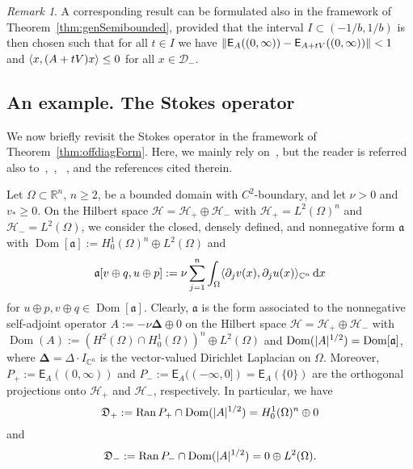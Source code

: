 \documentclass[11pt,a4paper]{amsart}
\numberwithin{equation}{section}
\DeclareMathOperator{\Ran}{Ran}
\DeclareMathOperator{\Dom}{Dom}
\DeclarePairedDelimiter{\abs}{|}{|}
\DeclarePairedDelimiter{\norm}{\lVert}{\rVert}
\DeclarePairedDelimiter{\scprod}{\langle}{\rangle}
\newcommand{\dd}{\mathrm d}
\newcommand{\RR}{\mathbb{R}}
\newcommand{\CC}{\mathbb{C}}
\newcommand{\EE}{\mathsf{E}}
\newcommand{\cD}{{\mathcal D}}
\newcommand{\cH}{{\mathcal H}}
\newcommand{\fa}{{\mathfrak a}}
\newcommand{\fD}{{\mathfrak D}}
\theoremstyle{plain}
\theoremstyle{definition}
\theoremstyle{remark}
\newtheorem{remark}[theorem]{Remark}
\begin{document}
\begin{remark}
  A corresponding result can be formulated also in the framework of Theorem~\ref{thm:genSemibounded}, provided that the interval
  $I \subset (-1/b,1/b)$ is then chosen such that for all $t \in I$ we have $\norm{\EE_A((0,\infty))-\EE_{A+tV}((0,\infty))} < 1$
  and $\scprod{ x , (A+tV)x } \le 0$ for all $x \in \cD_-$.
\end{remark}

\subsection*{An example. The Stokes operator}
We now briefly revisit the Stokes operator in the framework of Theorem~\ref{thm:offdiagForm}. Here, we mainly rely
on~\cite{GKMSV19}, but the reader is referred also to~\cite[Section~7]{GKMSV17},~\cite[Chapter~5]{SchmDiss},
~\cite{FFMM00}, and the references cited therein.

Let $\Omega \subset \RR^n$, $n \ge 2$, be a bounded domain with $C^2$-boundary, and let $\nu > 0$ and $v_* \ge 0$. On the Hilbert
space $\cH = \cH_+ \oplus \cH_-$ with $\cH_+ = L^2(\Omega)^n$ and $\cH_- = L^2(\Omega)$, we consider the closed, densely defined,
and nonnegative form $\fa$ with $\Dom[\fa] := H_0^1(\Omega)^n \oplus L^2(\Omega)$ and
\begin{equation*}
  \fa[ v \oplus q , u \oplus p ]
  :=
  \nu \sum_{j=1}^n \int_\Omega \scprod{ \partial_j v(x) , \partial_j u(x) }_{\CC^n} \,\dd x
\end{equation*}
for $u \oplus p, v \oplus q \in \Dom[\fa]$. Clearly, $\fa$ is the form associated to the nonnegative self-adjoint operator
$A := -\nu\mathbf{\Delta} \oplus 0$ on the Hilbert space $\cH = \cH_+ \oplus \cH_-$ with
$\Dom(A) := (H^2(\Omega) \cap H_0^1(\Omega))^n \oplus L^2(\Omega)$ and $\Dom(\abs{A}^{1/2}) = \Dom[\fa]$, where
$\mathbf{\Delta} = \Delta\cdot I_{\CC^n}$ is the vector-valued Dirichlet Laplacian on $\Omega$. Moreover,
$P_+ := \EE_A((0,\infty))$ and $P_- := \EE_A((-\infty,0]) = \EE_A(\{0\})$ are the orthogonal projections onto $\cH_+$ and
$\cH_-$, respectively. In particular, we have
\begin{equation*}
  \fD_+
  :=
  \Ran P_+ \cap \Dom(\abs{A}^{1/2})
  =
  H_0^1(\Omega)^n \oplus 0
\end{equation*}
and
\begin{equation*}
  \fD_-
  :=
  \Ran P_- \cap \Dom(\abs{A}^{1/2})
  =
  0 \oplus L^2(\Omega)
  .
\end{equation*}
\end{document}
